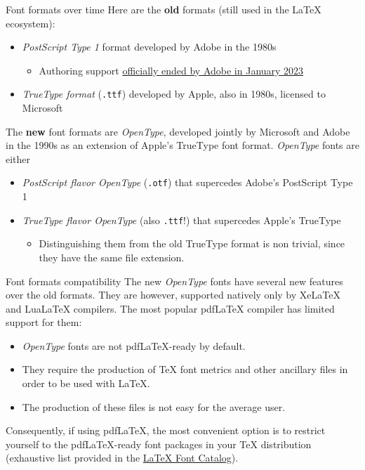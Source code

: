 \documentclass{beamer}
\newcommand{\hrefcol}[2]{\textcolor{uihteal}{\href{#1}{#2}}}
\begin{document}
\begin{frame}{Font formats over time}
Here are the \textbf{old} formats (still used in the LaTeX ecosystem):

\begin{itemize}
\item \emph{PostScript Type 1} format developed by Adobe in the 1980s
\begin{itemize}
    \item Authoring support \hrefcol{https://helpx.adobe.com/fonts/kb/postscript-type-1-fonts-end-of-support.html}{officially ended by Adobe in January 2023}
\end{itemize}
\item \emph{TrueType format} (\texttt{.ttf}) developed by Apple, also in 1980s, licensed to Microsoft
\end{itemize}

The \textbf{new} font formats are \emph{OpenType}, developed jointly by Microsoft and Adobe in the 1990s as an extension of Apple's TrueType font format. \emph{OpenType} fonts are either

\begin{itemize}
\item \emph{PostScript flavor OpenType} (\texttt{.otf}) that supercedes Adobe's PostScript Type 1
\item \emph{TrueType flavor OpenType} (also \texttt{.ttf}!) that supercedes Apple's TrueType
    \begin{itemize}
    \item Distinguishing them from the old TrueType format is non trivial, since they have the same file extension.
    \end{itemize}
\end{itemize}
\end{frame}


\begin{frame}{Font formats compatibility}
The new \emph{OpenType} fonts have several new features over the old formats. They are however, supported natively only by XeLaTeX and LuaLaTeX compilers. The most popular pdfLaTeX compiler has limited support for them:
\begin{itemize}
\item \emph{OpenType} fonts are not pdfLaTeX-ready by default.
\item They require the production of TeX font metrics and other ancillary files in order to be used with LaTeX.
\item The production of these files is not easy for the average user.
\end{itemize}
Consequently, if using pdfLaTeX, the most convenient option is to restrict yourself to the pdfLaTeX-ready font packages in your TeX distribution (exhaustive list provided in the \hrefcol{https://tug.org/FontCatalogue/}{LaTeX Font Catalog}).
\end{frame}
\end{document}

